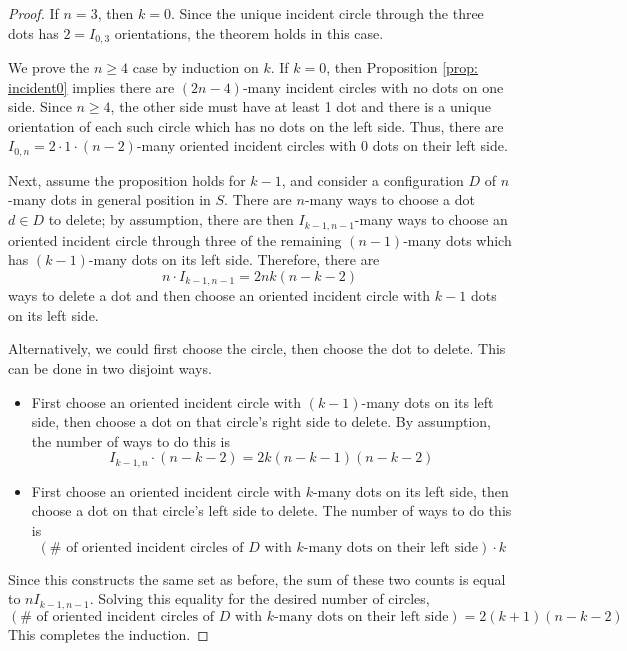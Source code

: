 \documentclass[11pt,oneside]{amsart}
\theoremstyle{definition}
\theoremstyle{remark}
\numberwithin{equation}{section}
\begin{document}
\begin{proof}
If $n=3$, then $k=0$. Since the unique incident circle through the three dots has $2=I_{0,3}$ orientations, the theorem holds in this case. %

We prove the $n\geq4$ case by induction on $k$. 
If $k=0$, then Proposition \ref{prop: incident0} implies there are $(2n-4)$-many incident circles with no dots on one side. Since $n\geq4$, the other side must have at least 1 dot and there is a unique orientation of each such circle which has no dots on the left side. Thus, there are $I_{0,n}=2\cdot 1\cdot(n-2)$-many oriented incident circles with $0$ dots on their left side.

Next, assume the proposition holds for $k-1$, and consider a configuration $D$ of $n$-many dots in general position in $S$. 
There are $n$-many ways to choose a dot $d\in D$ to delete; by assumption, there are then $I_{k-1,n-1}$-many ways to choose an oriented incident circle through three of the remaining $(n-1)$-many dots which has $(k-1)$-many dots on its left side. 
Therefore, there are
\[
n \cdot I_{k-1,n-1} = 2nk(n-k-2)
\]
ways to delete a dot and then choose an oriented incident circle with $k-1$ dots on its left side.

Alternatively, we could first choose the circle, then choose the dot to delete. This can be done in two disjoint ways.
    \begin{itemize}
        \item First choose an oriented incident circle with $(k-1)$-many dots on its left side, then choose a dot on that circle's right side to delete. By assumption, the number of ways to do this is
        \[
        I_{k-1,n}\cdot (n-k-2) = 2k(n-k-1)(n-k-2)
        \]
        \item First choose an oriented incident circle with $k$-many dots on its left side, then choose a dot on that circle's left side to delete. The number of ways to do this is
        \[
        (\text{$\#$ of oriented incident circles of $D$ with $k$-many dots on their left side})\cdot k
        \]
    \end{itemize}
Since this constructs the same set as before, the sum of these two counts is equal to $nI_{k-1,n-1}$. Solving this equality for the desired number of circles,
\[
(\text{$\#$ of oriented incident circles of $D$ with $k$-many dots on their left side})
=2(k+1)(n-k-2)%
\]
This completes the induction.
\end{proof}
\end{document}
